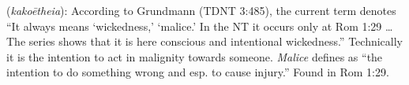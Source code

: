 \item[Malice,]

(\textit{kakoētheia}):
According to Grundmann (TDNT 3:485), the current term denotes ``It always means `wickedness,' `malice.' In the NT it occurs only at Rom 1:29 \ldots The series shows that it is here conscious and intentional wickedness.'' Technically it is the intention to act in malignity towards  someone. \emph{Malice} defines as ``the intention to do something wrong and esp. to cause injury.''
Found in Rom 1:29.
